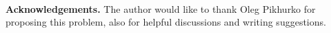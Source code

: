 \documentclass[11pt,a4paper]{article}
\theoremstyle{definition}
\begin{document}
~\



\noindent\textbf{Acknowledgements.} The author would like to thank Oleg Pikhurko for proposing this problem, also for helpful discussions and writing suggestions.



\end{document}

